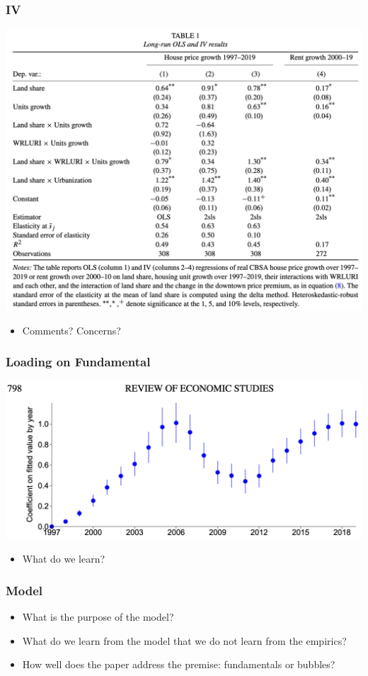 \documentclass[english,xcolor=svgnames]{beamer}
\begin{document}
\begin{frame}
	\frametitle[alignment=center]{IV}
	\centering
	\includegraphics[scale=0.4]{figures/CGMTAB1.png}
	\begin{itemize}
		\item Comments? Concerns?
	\end{itemize}
\end{frame}

\begin{frame}
	\frametitle[alignment=center]{Loading on Fundamental}
	\centering
	\includegraphics[scale=0.4]{figures/CGMFIG5.png}
	\begin{itemize}
		\item What do we learn?
	\end{itemize}
\end{frame}

\begin{frame}
	\frametitle[alignment=center]{Model}
	\begin{itemize}
		\item What is the purpose of the model?
		\item What do we learn from the model that we do not learn from the empirics?
		\item How well does the paper address the premise: fundamentals or bubbles?
	\end{itemize}
\end{frame}
\end{document}
